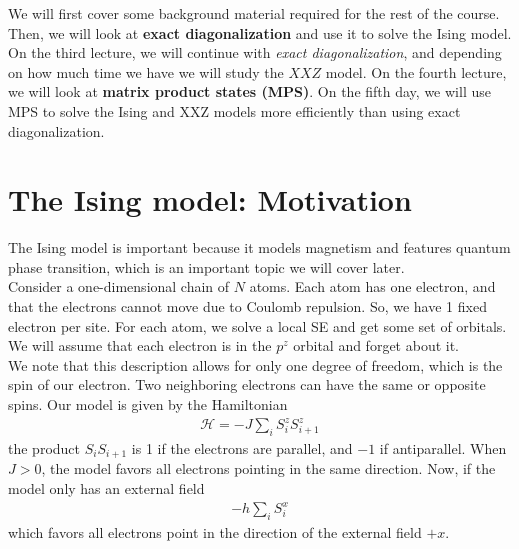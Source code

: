 \documentclass{book}
\theoremstyle{definition}
\newcommand{\had}{\mathcal{H}}
\begin{document}
We will first cover some background material required for the rest of the course. Then, we will look at \textbf{exact diagonalization} and use it to solve the Ising model. On the third lecture, we will continue with \textit{exact diagonalization}, and depending on how much time we have we will study the $XXZ$ model. On the fourth lecture, we will look at \textbf{matrix product states (MPS)}. On the fifth day, we will use MPS to solve the Ising and XXZ models more efficiently than using exact diagonalization.


\newpage
   





\section{The Ising model: Motivation}

The Ising model is important because it models magnetism and features quantum phase transition, which is an important topic we will cover later.\\

Consider a one-dimensional chain of $N$ atoms. Each atom has one electron, and that the electrons cannot move due to Coulomb repulsion. So, we have 1 fixed electron per site. For each atom, we solve a local SE and get some set of orbitals. \\

We will assume that each electron is in the $p^z$ orbital and forget about it. \\

We note that this description allows for only one degree of freedom, which is the spin of our electron. Two neighboring electrons can have the same or opposite spins. Our model is given by the Hamiltonian
\begin{align}
\had = -J \sum_i S_i^z S_{i+1}^z
\end{align}
the product $S_iS_{i+1}$ is 1 if the electrons are parallel, and $-1$ if antiparallel. When $J > 0$, the model favors all electrons pointing in the same direction. Now, if the model only has an external field
\begin{align}
-h \sum_i S_i^x
\end{align}
which favors all electrons point in the direction of the external field $+x$. \\
\end{document}
